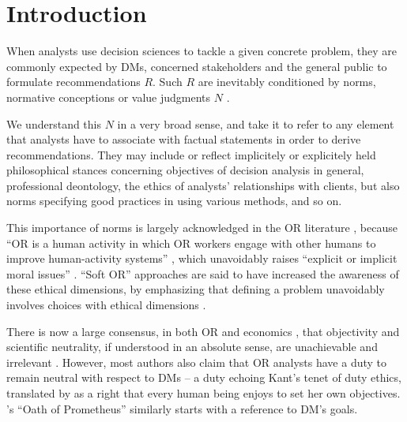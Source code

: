\documentclass[preprint, french, english, 11pt, authoryear]{elsarticle}%
\begin{document}
\maketitle

\section{Introduction}
When analysts use decision sciences to tackle a given concrete problem, they are commonly expected by \acp{DM}, concerned stakeholders and the general public to formulate recommendations $R$. 
Such $R$ are inevitably conditioned by norms, normative conceptions or value judgments $N$ \citep{funtowicz_science_1993,brans_ethics_2002,mingers_ethics_2011}.
\begin{changebar}We understand this $N$ in a very broad sense, and take it to refer to any element that analysts have to associate with factual statements in order to derive recommendations. 
They may include or reflect implicitely or explicitely held philosophical stances concerning objectives of decision analysis in general, professional deontology, the ethics of analysts' relationships with clients, but also norms specifying good practices in using various methods, and so on.\end{changebar}

\begin{changebar}
This importance of norms is largely acknowledged in the \ac{OR} literature \citep{churchman_operations_1970,taket_undercover_1994,brans_ethics_2007,picavet_opportunities_2009}, because ``\ac{OR} is a human activity in which \ac{OR} workers engage with other humans to improve human-activity systems'' \citep{ormerod_operational_2013}, which unavoidably raises ``explicit or implicit moral issues'' \citep{diekmann_moral_2013}.
``Soft \ac{OR}'' approaches are said to have increased the awareness of these ethical dimensions, by emphasizing that defining a problem unavoidably involves choices with ethical dimensions \citep{ulrich_beyond_2003}.\end{changebar}

\begin{changebar}
There is now a large consensus, in both \ac{OR} and economics \citep{buchanan_positive_1959, sen_nature_1967, dwyer_scientific_1985, heath_value_1994, sen_rationality_2004, mongin_value_2006, sen_idea_2009, baujard_value_2013},
that objectivity and scientific neutrality, if understood in an absolute sense, are unachievable and irrelevant \citep{le_menestrel_ethics_2004,reisach_creation_2016}. However, most authors also claim that \ac{OR} analysts have a duty to remain neutral with respect to \acp{DM} 
-- a duty echoing Kant’s tenet of duty ethics, translated by \citet{reisach_creation_2016} as a right that every human being enjoys to set her own objectives.
\citet{gass_ethical_2009}'s ``Oath of Prometheus'' similarly starts with a reference to \ac{DM}'s goals.\end{changebar}
\end{document}

